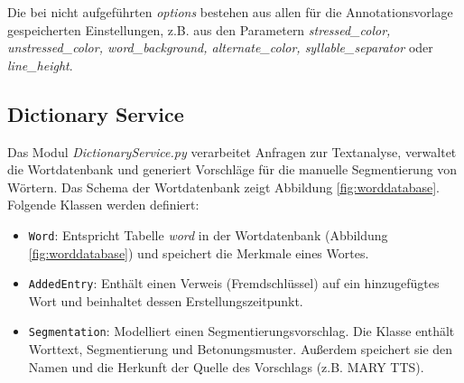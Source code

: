 Die bei  nicht aufgeführten \textit{options} bestehen aus allen für die Annotationsvorlage gespeicherten Einstellungen, z.B. aus den Parametern \textit{stressed\_color, unstressed\_color, word\_background, alternate\_color, syllable\_separator} oder \textit{line\_height}.

\subsection{Dictionary Service}
\label{sec:dictionary-service}

Das Modul \textit{DictionaryService.py} verarbeitet Anfragen zur Textanalyse, verwaltet die Wortdatenbank und generiert Vorschläge für die manuelle Segmentierung von Wörtern. Das Schema der Wortdatenbank zeigt Abbildung \ref{fig:worddatabase}. Folgende Klassen werden definiert:
\begin{itemize}
	\item \texttt{Word}: Entspricht Tabelle \textit{word} in der Wortdatenbank (Abbildung \ref{fig:worddatabase}) und speichert die Merkmale eines Wortes.
	\item \texttt{AddedEntry}: Enthält einen Verweis (Fremdschlüssel) auf ein hinzugefügtes Wort und beinhaltet dessen Erstellungszeitpunkt.
	\item \texttt{Segmentation}: Modelliert einen Segmentierungsvorschlag. Die Klasse enthält Worttext, Segmentierung und Betonungsmuster. Außerdem speichert sie den Namen und die Herkunft der Quelle des Vorschlags (z.B. MARY TTS).
\end{itemize}

